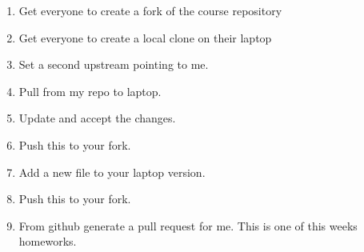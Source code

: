 \documentclass{article}
\begin{document}
\begin{enumerate}
\begin{enumerate}
\item Get everyone to create a fork of the course repository
\item Get everyone to create a local clone on their laptop
\item Set a second upstream pointing to me.
\item Pull from my repo to laptop.
\item Update and accept the changes.
\item Push this to your fork.
\item Add a new file to your laptop version.
\item Push this to your fork.
\item From github generate a pull request for me. This is one of this weeks homeworks.
\end{enumerate}
\end{enumerate}
\end{document}
